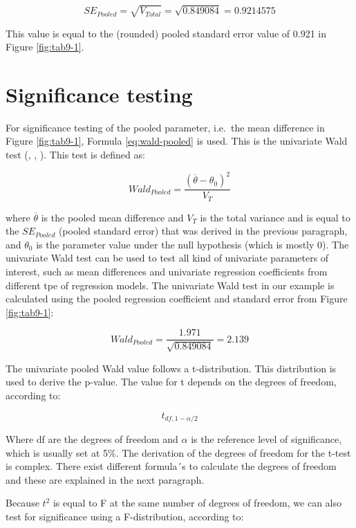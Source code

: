 \documentclass[]{book}
\begin{document}
\[SE_{Pooled} = \sqrt{V_{Total}} = \sqrt{0.849084} = 0.9214575\]

This value is equal to the (rounded) pooled standard error value of
0.921 in Figure \ref{fig:tab9-1}.

\section{Significance testing}\label{significance-testing}

For significance testing of the pooled parameter, i.e.~the mean
difference in Figure \ref{fig:tab9-1}, Formula \eqref{eq:wald-pooled} is
used. This is the univariate Wald test (\citet{rubin1987},
\citet{VanBuuren2018}, \citet{Marshall2009MedResMeth}). This test is
defined as:

\begin{equation}
Wald_{Pooled} =\frac{(\overline{\theta} - {\theta_0})^2}{V_T}
  \label{eq:wald-pooled}
\end{equation}

where \(\overline{\theta}\) is the pooled mean difference and \(V_T\) is
the total variance and is equal to the \(SE_{Pooled}\) (pooled standard
error) that was derived in the previous paragraph, and \(\theta_0\) is
the parameter value under the null hypothesis (which is mostly 0). The
univariate Wald test can be used to test all kind of univariate
parameters of interest, such as mean differences and univariate
regression coefficients from different tpe of regression models. The
univariate Wald test in our example is calculated using the pooled
regression coefficient and standard error from Figure \ref{fig:tab9-1}:

\[Wald_{Pooled} = \frac{1.971}{\sqrt{0.849084}}=2.139\]

The univariate pooled Wald value follows a t-distribution. This
distribution is used to derive the p-value. The value for t depends on
the degrees of freedom, according to:

\begin{equation}
t_{df,1-\alpha/2}
  \label{eq:t-distr}
\end{equation}

Where df are the degrees of freedom and \(\alpha\) is the reference
level of significance, which is usually set at 5\%. The derivation of
the degrees of freedom for the t-test is complex. There exist different
formula´s to calculate the degrees of freedom and these are explained in
the next paragraph.

Because \(t^2\) is equal to F at the same number of degrees of freedom,
we can also test for significance using a F-distribution, according to:
\end{document}
